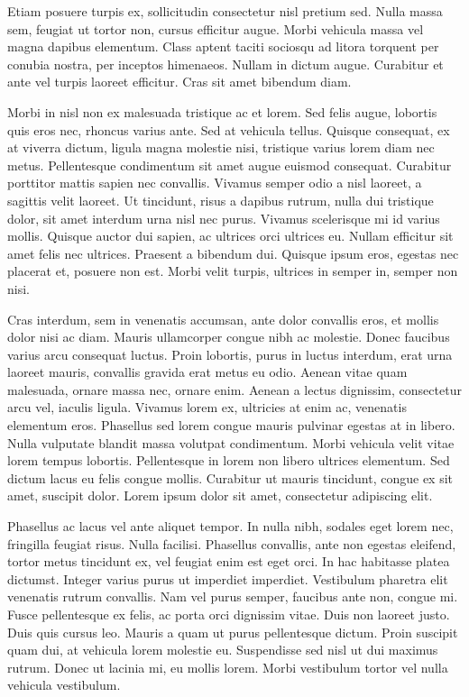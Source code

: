 Etiam posuere turpis ex, sollicitudin consectetur nisl pretium sed. Nulla massa sem, feugiat ut tortor non, cursus efficitur augue. Morbi vehicula massa vel magna dapibus elementum. Class aptent taciti sociosqu ad litora torquent per conubia nostra, per inceptos himenaeos. Nullam in dictum augue. Curabitur et ante vel turpis laoreet efficitur. Cras sit amet bibendum diam.

Morbi in nisl non ex malesuada tristique ac et lorem. Sed felis augue, lobortis quis eros nec, rhoncus varius ante. Sed at vehicula tellus. Quisque consequat, ex at viverra dictum, ligula magna molestie nisi, tristique varius lorem diam nec metus. Pellentesque condimentum sit amet augue euismod consequat. Curabitur porttitor mattis sapien nec convallis. Vivamus semper odio a nisl laoreet, a sagittis velit laoreet. Ut tincidunt, risus a dapibus rutrum, nulla dui tristique dolor, sit amet interdum urna nisl nec purus. Vivamus scelerisque mi id varius mollis. Quisque auctor dui sapien, ac ultrices orci ultrices eu. Nullam efficitur sit amet felis nec ultrices. Praesent a bibendum dui. Quisque ipsum eros, egestas nec placerat et, posuere non est. Morbi velit turpis, ultrices in semper in, semper non nisi.

Cras interdum, sem in venenatis accumsan, ante dolor convallis eros, et mollis dolor nisi ac diam. Mauris ullamcorper congue nibh ac molestie. Donec faucibus varius arcu consequat luctus. Proin lobortis, purus in luctus interdum, erat urna laoreet mauris, convallis gravida erat metus eu odio. Aenean vitae quam malesuada, ornare massa nec, ornare enim. Aenean a lectus dignissim, consectetur arcu vel, iaculis ligula. Vivamus lorem ex, ultricies at enim ac, venenatis elementum eros. Phasellus sed lorem congue mauris pulvinar egestas at in libero. Nulla vulputate blandit massa volutpat condimentum. Morbi vehicula velit vitae lorem tempus lobortis. Pellentesque in lorem non libero ultrices elementum. Sed dictum lacus eu felis congue mollis. Curabitur ut mauris tincidunt, congue ex sit amet, suscipit dolor. Lorem ipsum dolor sit amet, consectetur adipiscing elit.

Phasellus ac lacus vel ante aliquet tempor. In nulla nibh, sodales eget lorem nec, fringilla feugiat risus. Nulla facilisi. Phasellus convallis, ante non egestas eleifend, tortor metus tincidunt ex, vel feugiat enim est eget orci. In hac habitasse platea dictumst. Integer varius purus ut imperdiet imperdiet. Vestibulum pharetra elit venenatis rutrum convallis. Nam vel purus semper, faucibus ante non, congue mi. Fusce pellentesque ex felis, ac porta orci dignissim vitae. Duis non laoreet justo. Duis quis cursus leo. Mauris a quam ut purus pellentesque dictum. Proin suscipit quam dui, at vehicula lorem molestie eu. Suspendisse sed nisl ut dui maximus rutrum. Donec ut lacinia mi, eu mollis lorem. Morbi vestibulum tortor vel nulla vehicula vestibulum.








